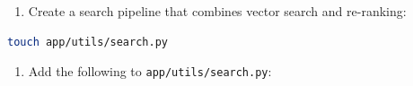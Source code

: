 \documentclass[
  screen,review,acmlarge]{acmart}
\newcommand{\passthrough}[1]{#1}
\providecommand{\tightlist}{%
  \setlength{\itemsep}{0pt}\setlength{\parskip}{0pt}}
\begin{document}
\begin{enumerate}
\def\labelenumi{\arabic{enumi}.}
\setcounter{enumi}{4}
\tightlist
\item
  Create a search pipeline that combines vector search and re-ranking:
\end{enumerate}

\begin{lstlisting}[language=bash]
touch app/utils/search.py
\end{lstlisting}

\begin{enumerate}
\def\labelenumi{\arabic{enumi}.}
\setcounter{enumi}{5}
\tightlist
\item
  Add the following to \passthrough{\lstinline!app/utils/search.py!}:
\end{enumerate}
\end{document}
